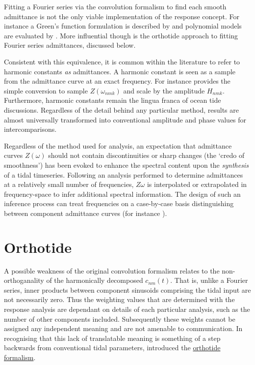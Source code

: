 Fitting a Fourier series via the convolution formalism to find each smooth admittance is not the only viable implementation of the response concept.  For instance a Green's function formulation is described by \citet{Webb:1974ke} and polynomial models are evaluated by \citet{Desai:1995je}. More influential though is the orthotide approach to fitting Fourier series admittances, discussed below.


Consistent with this equivalence, it is common within the literature to refer to harmonic constants \emph{as} admittances.   A harmonic constant is seen as a sample from the admittance curve at an exact frequency. For instance \citet{Smith:1997ut} provides the simple conversion to sample $Z(\omega_{nmk})$ and scale by the \ATGP{} amplitude $H_{nmk}$.
Furthermore, harmonic constants remain the lingua franca of ocean tide discussions. Regardless of the detail behind any particular method, results are almost universally transformed into conventional amplitude and phase values for intercomparisons.


Regardless of the method used for analysis, an expectation that admittance curves $Z(\omega)$ should not contain discontinuities or sharp changes (the `credo of smoothness') has been evoked to enhance the spectral content upon the \emph{synthesis} of a tidal timeseries.  Following an analysis performed to determine admittances at a relatively small number of frequencies, $Z{\omega}$ is interpolated or extrapolated in frequency-space to infer additional spectral information.   The design of such an inference process can treat frequencies on a case-by-case basis distinguishing between component admittance curves (for instance \citet[pp 268]{Fu:2001ub}).

\section{Orthotide}%
A possible weakness of the original convolution formalism relates to the non-orthoganality of the harmonically decomposed $c_{nm}(t)$.  That is, unlike a Fourier series, inner products between component sinusoids comprising the tidal input are not necessarily zero.   Thus the weighting values that are determined with the response analysis are dependant on details of each particular analysis, such as the number of other components included.  Subsequently these weights cannot be assigned any independent meaning and are not amenable to communication.  
In recognising that this lack of translatable meaning is something of a step backwards from conventional tidal parameters, \citet{Groves:1975ky} introduced the \underline{orthotide formalism}.

